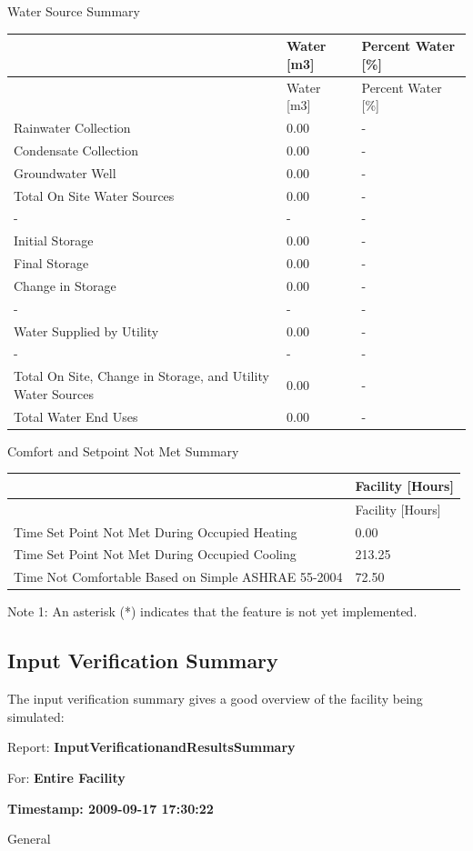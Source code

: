 Water Source Summary

\begin{longtable}[c]{>{\raggedright}p{3.0in}p{1.5in}p{1.5in}}
\toprule
~ & Water [m3] & Percent Water [\%] \tabularnewline
\midrule
\endfirsthead

\toprule
~ & Water [m3] & Percent Water [\%] \tabularnewline
\midrule
\endhead

Rainwater Collection & 0.00 & - \tabularnewline
Condensate Collection & 0.00 & - \tabularnewline
Groundwater Well & 0.00 & - \tabularnewline
Total On Site Water Sources & 0.00 & - \tabularnewline
- & - & - \tabularnewline
Initial Storage & 0.00 & - \tabularnewline
Final Storage & 0.00 & - \tabularnewline
Change in Storage & 0.00 & - \tabularnewline
- & - & - \tabularnewline
Water Supplied by Utility & 0.00 & - \tabularnewline
- & - & - \tabularnewline
Total On Site, Change in Storage, and Utility Water Sources & 0.00 & - \tabularnewline
Total Water End Uses & 0.00 & - \tabularnewline
\bottomrule
\end{longtable}

Comfort and Setpoint Not Met Summary

\begin{longtable}[c]{p{4.5in}p{1.5in}}
\toprule
~ & Facility [Hours] \tabularnewline
\midrule
\endfirsthead

\toprule
~ & Facility [Hours] \tabularnewline
\midrule
\endhead

Time Set Point Not Met During Occupied Heating & 0.00 \tabularnewline
Time Set Point Not Met During Occupied Cooling & 213.25 \tabularnewline
Time Not Comfortable Based on Simple ASHRAE 55-2004 & 72.50 \tabularnewline
\bottomrule
\end{longtable}

Note 1: An asterisk (*) indicates that the feature is not yet implemented.

\subsection{Input Verification Summary}\label{input-verification-summary}

The input verification summary gives a good overview of the facility being simulated:

Report: \textbf{InputVerificationandResultsSummary}

For: \textbf{Entire Facility}

\textbf{Timestamp: 2009-09-17 17:30:22}

General

